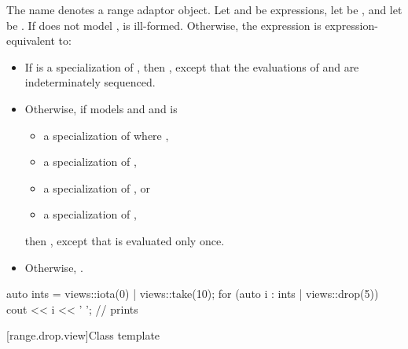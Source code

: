 \pnum
{}%
The name  denotes
a range adaptor object.
Let  and  be expressions,
let  be , and
let  be .
If  does not model
,
 is ill-formed.
Otherwise, the expression 
is expression-equivalent to:
\begin{itemize}
\item
If  is a specialization of
,
then ,
except that the evaluations of  and 
are indeterminately sequenced.

\item
Otherwise, if  models
 and 
and is
\begin{itemize}
\item a specialization of  where ,
\item a specialization of ,
\item a specialization of , or
\item a specialization of ,
\end{itemize}
then ,
except that  is evaluated only once.

\item
Otherwise, .
\end{itemize}

\pnum
\begin{example}
\begin{codeblock}
auto ints = views::iota(0) | views::take(10);
for (auto i : ints | views::drop(5)) {
  cout << i << ' ';                             // prints 
}
\end{codeblock}
\end{example}

[range.drop.view]{Class template }

